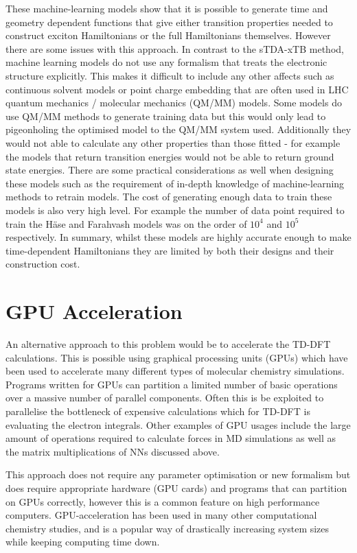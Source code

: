 These machine-learning models show that it is possible to generate time and geometry
dependent functions that give either transition properties needed to construct exciton
Hamiltonians or the full Hamiltonians themselves. However there are some issues 
with this approach. In contrast to the sTDA-xTB method, machine learning models 
do not use any formalism that treats the electronic structure explicitly. This makes 
it difficult to include any other affects such as continuous solvent models or 
point charge embedding that are often used in LHC quantum mechanics / molecular 
mechanics (QM/MM) models. Some models do use QM/MM methods to generate training 
data but this would only lead to pigeonholing the optimised model to the QM/MM system
used. Additionally they would not able to calculate any other properties than those
fitted - for example the models that return \Qy transition energies would not be 
able to return ground state energies. There are some practical considerations as 
well when designing these models such as the requirement of in-depth knowledge of
machine-learning methods to retrain models. The cost of generating enough data to
train these models is also very high level. For example the number of data point 
required to train the H\"{a}se and Farahvash models was on the order of $10^4$ and 
$10^5$ respectively. In summary, whilst these models are highly accurate enough 
to make time-dependent Hamiltonians they are limited by both their designs and their
construction cost.

\section{GPU Acceleration}
\label{sec:gpu_acceleration}

An alternative approach to this problem would be to accelerate the TD-DFT calculations.
This is possible using graphical processing units (GPUs) which have been used to
accelerate many different types of molecular chemistry simulations. Programs written
for GPUs can partition a limited number of basic operations over a massive number
of parallel components. Often this is be exploited to parallelise the bottleneck
of expensive calculations which for TD-DFT is evaluating the electron integrals.
Other examples of GPU usages include the large amount of operations required to
calculate forces in MD simulations as well as the matrix multiplications of NNs
discussed above.

This approach does not require any parameter optimisation or new formalism but does
require appropriate hardware (GPU cards) and programs that can partition on GPUs
correctly, however this is a common feature on high performance computers. GPU-acceleration
has been used in many other computational chemistry studies, and is a popular way 
of drastically increasing system sizes while keeping computing time down.

